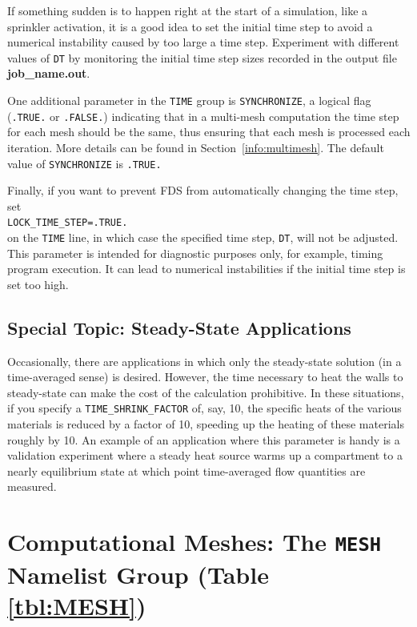 \documentclass[11pt]{book}
\newcommand{\ct}{\tt\small}
\begin{document}
\begin{warning}
If something sudden is to happen right at the start of a simulation,
like a sprinkler activation, it is a good idea to set the initial time step
to avoid a numerical instability caused by too large a time step.
Experiment with different values of {\ct DT} by monitoring the initial time step sizes
recorded in the output file {\bf job\_name.out}.
\end{warning}

\noindent
One additional parameter in the {\ct TIME} group is {\ct SYNCHRONIZE}, a
logical flag ({\ct .TRUE.} or {\ct .FALSE.}) indicating that in a
multi-mesh computation the time step for each mesh should be the same, thus
ensuring that each mesh is processed each iteration. More details can
be found in Section~\ref{info:multimesh}. The default value of {\ct SYNCHRONIZE} is {\ct .TRUE.}

Finally, if you want to prevent FDS from automatically changing the time step, set \\
{\ct LOCK\_TIME\_STEP=.TRUE.} \\
on the {\ct TIME} line, in which case the specified
time step, {\ct DT}, will not be adjusted.
This parameter is intended for diagnostic purposes only, for example, timing program execution. It can lead to
numerical instabilities if the initial time step is set too high.



\subsection{Special Topic: Steady-State Applications}
\label{info:steady_state}

Occasionally, there are applications in which only the steady-state solution (in a time-averaged sense) is desired. However, the time necessary to
heat the walls to steady-state can make the cost of the calculation prohibitive. In these situations, if you specify a
{\ct TIME\_SHRINK\_FACTOR} of, say, 10, the specific heats of the various materials is reduced by a factor of 10, speeding up the heating
of these materials roughly by 10. An example of an application where this parameter is handy is a validation experiment where a steady heat source
warms up a compartment to a nearly equilibrium state at which point time-averaged flow quantities are measured.



\newpage

\section{Computational Meshes: The \texorpdfstring{{\tt MESH}}{MESH} Namelist Group (Table \ref{tbl:MESH})}
\label{info:MESH}
\end{document}
